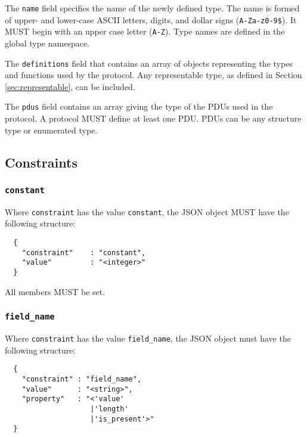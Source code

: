 \documentclass[10pt,twocolumn,a4paper]{article}
\newcommand{\code}[1]{\texttt{#1}}
\begin{document}
The \code{name} field specifies the name of the newly defined type. The
name is formed of upper- and lower-case ASCII letters, digits, and dollar
signs (\code{A-Za-z0-9\$}).  It MUST begin with an upper case letter
(\code{A-Z}). Type names are defined in the global type namespace.

The \code{definitions} field that contains an array of objects representing
the types and functions used by the protocol. Any representable type, as
defined in Section \ref{sec:representable}, can be included.

The \code{pdus} field contains an array giving the type of the PDUs used
in the protocol. A protocol MUST define at least one PDU. PDUs can be any
structure type or enumerated type. 

\subsection{Constraints}
\label{sec:constraints}

\subsubsection{\texttt{constant}}

Where \texttt{constraint} has the value \texttt{constant}, the JSON object MUST have the
following structure:

\begin{verbatim}
  {
    "constraint"    : "constant",
    "value"         : "<integer>"
  }
\end{verbatim}

All members MUST be set.

\subsubsection{\texttt{field\_name}}

Where \texttt{constraint} has the value \texttt{field\_name}, the JSON object must have
the following structure:

\begin{verbatim}
  {
    "constraint" : "field_name",
    "value"      : "<string>",
    "property"   : "<'value'
                    |'length'
                    |'is_present'>"
  }
\end{verbatim}
\end{document}
